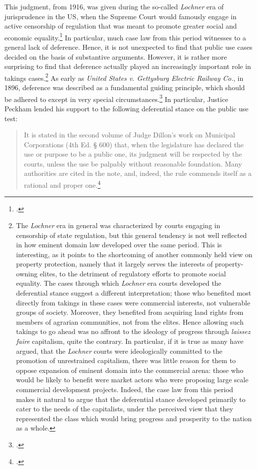 This judgment, from 1916, was given during the so-called {\it Lochner} era of jurisprudence in the US, when the Supreme Court  would famously engage in active censorship of regulation that was meant to promote greater social and economic equality.\footcite{cohen08} In particular, much case law from this period witnesses to a general lack of deference. Hence, it is not unexpected to find that public use cases decided on the basis of substantive arguments. However, it is rather more surprising to find that deference actually played an increasingly important role in takings cases.\footnote{The {\it Lochner} era in general was characterized by courts engaging in censorship of state regulation, but this general tendency is not well reflected in how eminent domain law developed over the same period. This is interesting, as it points to the shortcoming of another commonly held view on property protection, namely that it largely serves the interests of property-owning elites, to the detriment of regulatory efforts to promote social equality. The cases through which {\it Lochner} era courts developed the deferential stance suggest a different interpretation; those who benefited most directly from takings in these cases were commercial interests, not vulnerable groups of society. Moreover, they benefited from acquiring land rights from members of agrarian communities, not from the elites. Hence allowing such takings to go ahead was no affront to the ideology of progress through {\it laissez faire} capitalism, quite the contrary. In particular, if it is true as many have argued, that the {\it Lochner} courts were ideologically committed to the promotion of unrestrained capitalism, there was little reason for them to oppose expansion of eminent domain into the commercial arena: those who would be likely to benefit were market actors who were proposing large scale commercial development projects. Indeed, the case law from this period makes it natural to argue that the deferential stance developed primarily to cater to the needs of the capitalists, under the perceived view that they represented the class which would bring progress and prosperity to the nation as a whole.} As early as { \it United States v. Gettysburg Electric Railway Co.}, in 1896, deference was described as a fundamental guiding principle, which should be adhered to except in very special circumstances.\footcite{gettysburg96} In particular, Justice Peckham lended his support to the following deferential stance on the public use test:

\begin{quote}
It is stated in the second volume of Judge Dillon's work on Municipal Corporations (4th Ed. § 600) that, when the legislature has declared the use or purpose to be a public one, its judgment will be respected by the courts, unless the use be palpably without reasonable foundation. Many authorities are cited in the note, and, indeed, the rule commends itself as a rational and proper one.\footcite[680]{gettysburg96}
\end{quote}

